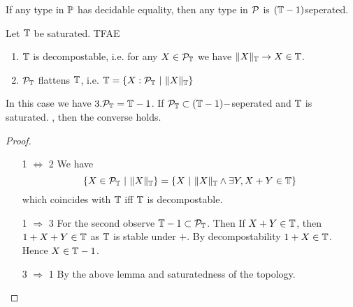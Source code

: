 \begin{example}
	If any type in $\mathbb{P}$ has decidable equality, then any type in $\mathcal{P}$ is $(\mathbb{T}-1)$seperated.
\end{example}
\begin{prop}{\label{prop:detectDecompostable}}
Let $\mathbb{T}$ be saturated. TFAE
	\begin{enumerate}
		\item  $\mathbb{T}$ is decompostable, i.e. for any $X \in \mathcal{P}_{\mathbb{T}}$ we have $\|X\|_{\mathbb{T}} \to X \in \mathbb{T}$.
		\item $\mathcal{P}_{\mathbb{T}}$ flattens $\mathbb{T}$, i.e. $\mathbb{T} = \{X : \mathcal{P}_{\mathbb{T}} \ | \ \|X\|_{\mathbb{T}} \}$ %
	\end{enumerate}
	In this case we have  $3 . \mathcal{P}_{\mathbb{T}} = \mathbb{T} - 1$. If $\mathcal{P}_{\mathbb{T}} \subset (\mathbb{T}-1)-$seperated and $\mathbb{T}$ is saturated.  , then the converse holds.
\end{prop}
\begin{proof}
	\ \begin{itemize}
			\item [1 $\Leftrightarrow$ 2]
		We have
		\[
		\{X \in \mathcal{P}_{\mathbb{T}} \ | \ \|X \|_{\mathbb{T}}\} = \{ X \ | \ \|X\|_{\mathbb{T}} \land \exists Y , X + Y \in \mathbb{T} \}
		\] %
		which coincides with $\mathbb{T}$ iff $\mathbb{T}$ is decompostable.
	\item [1 $\Rightarrow$ 3]
	For the second observe $\mathbb{T} - 1 \subset \mathcal{P}_{\mathbb{T}}$. Then If $X + Y \in \mathbb{T}$, then $1 + X + Y \in \mathbb{T}$ as $\mathbb{T}$ is stable under $+$. By decompostability $1 + X \in \mathbb{T}$. Hence $X \in \mathbb{T} - 1$. %
	\item [3 $\Rightarrow$ 1]
	By the above lemma and saturatedness of the topology.

\end{itemize}	
\end{proof}

